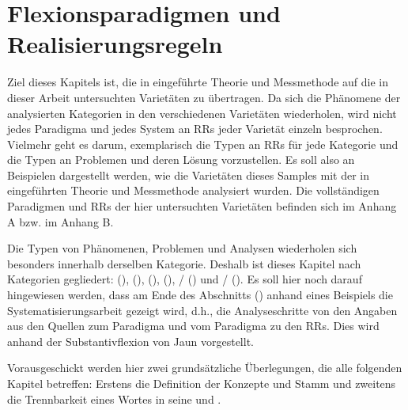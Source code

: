 \chapter{Flexionsparadigmen und Realisierungsregeln}\label{5}

Ziel dieses Kapitels ist, die in  eingeführte Theorie und Messmethode auf die in dieser Arbeit untersuchten Varietäten zu übertragen. Da sich die Phänomene der analysierten Kategorien in den verschiedenen Varietäten wiederholen, wird nicht jedes Paradigma und jedes System an RRs jeder Varietät einzeln besprochen. Vielmehr geht es darum, exemplarisch die Typen an RRs für jede Kategorie und die Typen an Problemen und deren Lösung vorzustellen. Es soll also an Beispielen dargestellt werden, wie die Varietäten dieses Samples mit der in  eingeführten Theorie und Messmethode analysiert wurden. Die vollständigen Paradigmen und RRs der hier untersuchten Varietäten befinden sich im Anhang A bzw. im Anhang B.

Die Typen von Phänomenen, Problemen und Analysen wiederholen sich besonders innerhalb derselben Kategorie. Deshalb ist dieses Kapitel nach Kategorien gegliedert:  (),  (),  (),  (), / () und / (). Es soll hier noch darauf hingewiesen werden, dass am Ende des Abschnitts  () anhand eines Beispiels die Systematisierungsarbeit gezeigt wird, d.h., die Analyseschritte von den Angaben aus den Quellen zum Paradigma und vom Paradigma zu den RRs. Dies wird anhand der Substantivflexion von Jaun vorgestellt.

Vorausgeschickt werden hier zwei grundsätzliche Überlegungen, die alle folgenden Kapitel betreffen: Erstens die Definition der Konzepte  und Stamm und zweitens die Trennbarkeit eines Wortes in seine  und .

